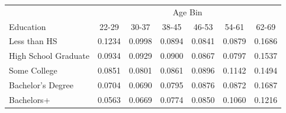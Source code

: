 \begin{tabular}{lcccccc}
\hline\hline
 & \multicolumn{6}{c}{Age Bin} \\
Education & 22-29 & 30-37 & 38-45 & 46-53 & 54-61 & 62-69 \\
\hline
Less than HS&0.1234&0.0998&0.0894&0.0841&0.0879&0.1686\\
High School Graduate&0.0934&0.0929&0.0900&0.0867&0.0797&0.1537\\
Some College&0.0851&0.0801&0.0861&0.0896&0.1142&0.1494\\
Bachelor's Degree&0.0704&0.0690&0.0795&0.0876&0.0872&0.1687\\
Bachelors+&0.0563&0.0669&0.0774&0.0850&0.1060&0.1216\\
\hline\hline
\end{tabular}

